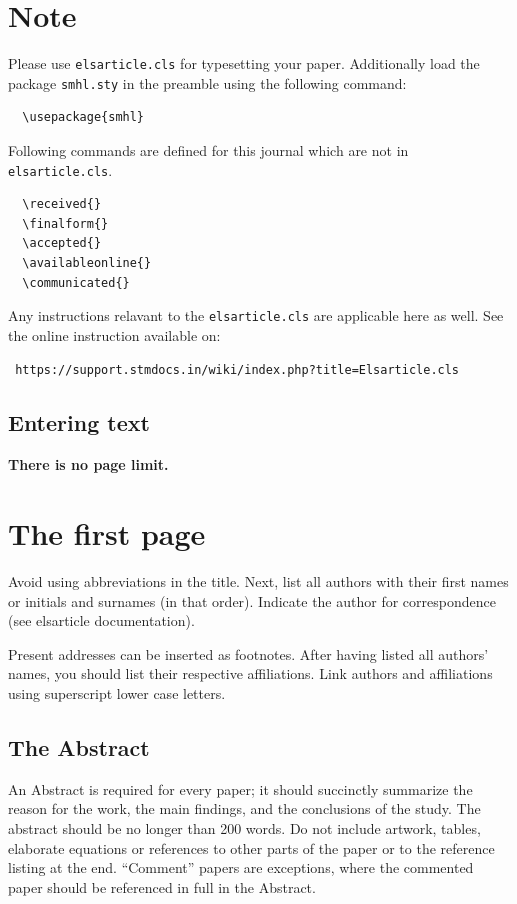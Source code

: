 \documentclass[times,onecolumn,final,longtitle]{elsarticle}
\begin{document}

\section{Note}
\label{sec1}
Please use \verb+elsarticle.cls+ for typesetting your paper.
Additionally load the package \verb+smhl.sty+ in the preamble using
the following command:
\begin{verbatim}
  \usepackage{smhl}
\end{verbatim}

Following commands are defined for this journal which are not in
\verb+elsarticle.cls+.
\begin{verbatim}
  \received{}
  \finalform{}
  \accepted{}
  \availableonline{}
  \communicated{}
\end{verbatim}

Any instructions relavant to the \verb+elsarticle.cls+ are applicable
here as well. See the online instruction available on:
\begin{verbatim}
 https://support.stmdocs.in/wiki/index.php?title=Elsarticle.cls
\end{verbatim}

\subsection{Entering text}
\textcolor{newcolor}{\bf There is no page limit.}

\section{The first page}
Avoid using abbreviations in the title. Next, list all authors with
their first names or initials and surnames (in that order). Indicate
the author for correspondence (see elsarticle documentation).

Present addresses can be inserted as footnotes. After having listed all
authors' names, you should list their respective affiliations. Link
authors and affiliations using superscript lower case letters.

\subsection{The Abstract}
An Abstract is required for every paper; it should succinctly summarize
the reason for the work, the main findings, and the conclusions of the
study. The abstract should be no longer than 200 words. Do not include
artwork, tables, elaborate equations or references to other parts of
the paper or to the reference listing at the end. ``Comment'' papers
are exceptions, where the commented paper should be referenced in full
in the Abstract.
\end{document}
